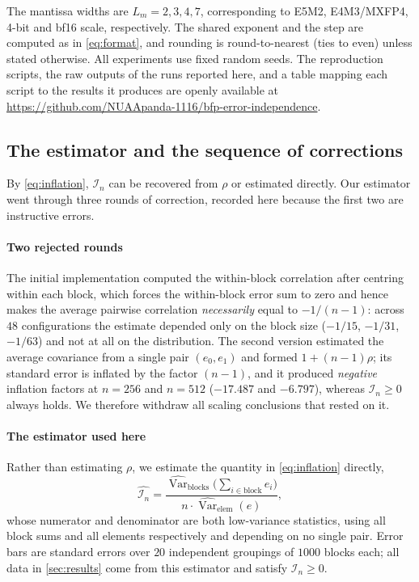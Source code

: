 \documentclass[review,hidelinks,oneeqnum,onetabnum,onefignum,onethmnum]{siamart251216}
\begin{document}
The mantissa widths are $L_m=2,3,4,7$, corresponding to E5M2, E4M3/MXFP4,
4-bit and bf16 scale, respectively. The shared exponent and the step are
computed as in \cref{eq:format}, and rounding is round-to-nearest (ties to even)
unless stated otherwise. All experiments use fixed random seeds. The
reproduction scripts, the raw outputs of the runs reported here, and a table
mapping each script to the results it produces are openly available at
\url{https://github.com/NUAApanda-1116/bfp-error-independence}.

\subsection{The estimator and the sequence of corrections}
\label{sec:estimator}

By \cref{eq:inflation}, $\mathcal I_n$ can be recovered from $\rho$ or estimated
directly. Our estimator went through three rounds of correction, recorded here
because the first two are instructive errors.

\paragraph{Two rejected rounds} The initial implementation computed the within-block
correlation after centring within each block, which forces the within-block error
sum to zero and hence makes the average pairwise correlation \emph{necessarily}
equal to $-1/(n-1)$: across $48$ configurations the estimate depended only on the
block size ($-1/15$, $-1/31$, $-1/63$) and not at all on the distribution. The
second version estimated the average covariance from a single pair $(e_0,e_1)$ and
formed $1+(n-1)\rho$; its standard error is inflated by the factor $(n-1)$, and it
produced \emph{negative} inflation factors at $n=256$ and $n=512$ ($-17.487$ and
$-6.797$), whereas $\mathcal I_n\ge0$ always holds. We therefore withdraw all
scaling conclusions that rested on it.

\paragraph{The estimator used here} Rather than estimating $\rho$, we estimate the
quantity in \cref{eq:inflation} directly,
\begin{equation}
\widehat{\mathcal I_n}
=\frac{\widehat{\operatorname{Var}}_{\text{blocks}}\bigl(\sum_{i\in\text{block}}e_i\bigr)}
{n\cdot\widehat{\operatorname{Var}}_{\text{elem}}(e)} ,
\label{eq:estimator}
\end{equation}
whose numerator and denominator are both low-variance statistics, using all block
sums and all elements respectively and depending on no single pair. Error bars are
standard errors over $20$ independent groupings of $1000$ blocks each; all data in
\cref{sec:results} come from this estimator and satisfy $\mathcal I_n\ge0$.
\end{document}
